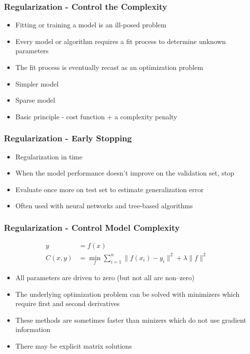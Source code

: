 \documentclass{beamer}
\begin{document}
\begin{frame}
\frametitle{Regularization - Control the Complexity}
\begin{itemize}
\item Fitting or training a model is an ill-posed problem
\item Every model or algorithm requires a fit process to determine unknown parameters
\item The fit process is eventually recast as an optimization problem
\item Simpler model
\item Sparse model
\item Basic principle - cost function + a complexity penalty
\end{itemize}
\end{frame}

\begin{frame}
\frametitle{Regularization - Early Stopping}
\begin{itemize}
\item Regularization in time
\item When the model performance doesn't improve on the validation set, stop
\item Evaluate once more on test set to estimate generalization error
\item Often used with neural networks and tree-based algorithms
\end{itemize}
\end{frame}

\begin{frame}
\frametitle{Regularization - Control Model Complexity}
\begin{align}
y &= f(x) \\
C(x, y) &= \min_f \sum_{i=1}^{n} \| f(x_i) - y_i \|^2 + \lambda \| f \|^2
\end{align}
\begin{itemize}
\item All parameters are driven to zero (but not all are non--zero)
\item The underlying optimization problem can be solved with minimizers which require first and second derivatives
\item These methods are sometimes faster than minizers which do not use gradient information
\item There may be explicit matrix solutions
\end{itemize}
\end{frame}
\end{document}
